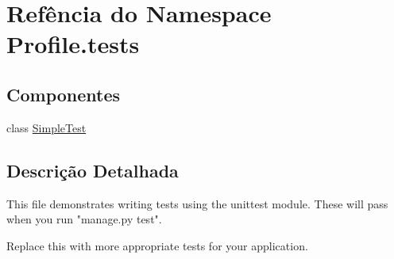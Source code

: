 \hypertarget{namespaceProfile_1_1tests}{\section{Refência do Namespace Profile.\-tests}
\label{de/d83/namespaceProfile_1_1tests}
}
\subsection*{Componentes}
\begin{DoxyCompactItemize}
\item 
class \hyperlink{classProfile_1_1tests_1_1SimpleTest}{Simple\-Test}
\end{DoxyCompactItemize}


\subsection{Descrição Detalhada}
\begin{DoxyVerb}This file demonstrates writing tests using the unittest module. These will pass
when you run "manage.py test".

Replace this with more appropriate tests for your application.
\end{DoxyVerb}
 